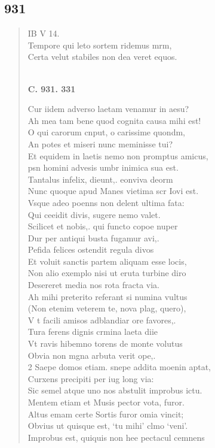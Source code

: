 \documentclass[11pt, a4paper]{report}
\begin{document}
            \subsection*{931}
      \begin{verse}
      IB V 14. \\ Tempore qui leto sortem ridemus mrm, \\ Certa velut stabiles non dea veret equos. \\ 
        ﻿\pagebreak 
    \begin{center} \textbf{C. 931. 331} \end{center} \marginpar{[353]} Cur iidem adverso laetam venamur in aesu? \\ Ah mea tam bene quod cognita causa mihi est! \\ O qui carorum cnput, o carissime quondm, \\ An potes et miseri nunc meminisse tui? \\ Et equidem in laetis nemo non promptus amicus, \\ psn homini advesis umbr inimica sua est. \\ Tantalus infelix, dieunt,. eonviva deorm \\ Nunc quoque apud Manes vietima scr Iovi est. \\ Vsque adeo poenns non delent ultima fata: \\ Qui ceeidit divis, sugere nemo valet. \\ Scilicet et nobis,. qui functo copoe nuper \\ Dur per antiqui busta fugamur avi,. \\ Pefida felices ostendit regula divos \\ Et voluit sanctis partem aliquam esse locis, \\ Non alio exemplo nisi ut eruta turbine diro \\ Desereret media nos rota fracta via. \\ Ah mihi preterito referant si numina vultus \\ (Non etenim veterem te, nova plag, quero), \\ V t facili amisos adblandiar ore favores,. \\ Tura ferens dignis crmina laeta diie \\ Vt ravis hibemno torens de monte volutus \\ Obvia non mgna arbuta verit ope,. \\ 2 Saepe domos etiam. snepe addita moenin aptat, \\ Curxens precipiti per iug long via: \\ Sic semel atque uno nos abstulit improbus ictu. \\ Mentem etiam et Musis pector vota, furor. \\ Altus emam certe Sortis furor omia vincit; \\ Obvius ut quisque est, ‘tu mihi’ clmo ‘veni’. \\ Improbus est, quiquis non hee pectacul cemnens \\ 

\end{verse}
\end{document}
